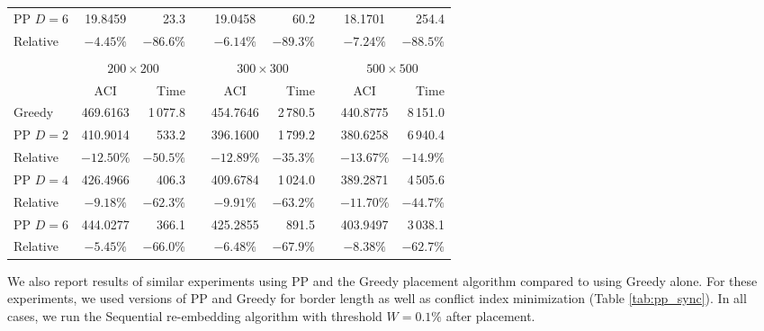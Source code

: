 \begin{table}[t!]
{\begin{tabular}{lcrlcrlcr}
\hline
PP $D=6$ &  19.8459 &  23.3   & &  19.0458 &  60.2   & &  18.1701 &    254.4   \\
Relative & $-4.45\%$&$-86.6\%$& & $-6.14\%$&$-89.3\%$& & $-7.24\%$&   $-88.5\%$\\
\hline
\\
\vspace{1pt}
 & \multicolumn{2}{c}{$200\times 200$} & & \multicolumn{2}{c}{$300\times 300$} & & \multicolumn{2}{c}{$500\times 500$} \\
\cline{2-3} \cline{5-6} \cline{8-9}
\vspace{1pt}
         & ACI      & Time       & & ACI      & Time       & & ACI      & Time       \\
\hline
Greedy   & 469.6163 & 1\,077.8   & & 454.7646 & 2\,780.5   & & 440.8775 & 8\,151.0   \\
\hline
PP $D=2$ & 410.9014 &    533.2   & & 396.1600 & 1\,799.2   & & 380.6258 & 6\,940.4   \\
Relative &$-12.50\%$&   $-50.5\%$& &$-12.89\%$&   $-35.3\%$& &$-13.67\%$&   $-14.9\%$\\
\hline
PP $D=4$ & 426.4966 &    406.3   & & 409.6784 & 1\,024.0   & & 389.2871 & 4\,505.6   \\
Relative & $-9.18\%$&   $-62.3\%$& & $-9.91\%$&   $-63.2\%$& &$-11.70\%$&   $-44.7\%$\\
\hline
PP $D=6$ & 444.0277 &    366.1   & & 425.2855 &    891.5   & & 403.9497 & 3\,038.1   \\
Relative & $-5.45\%$&   $-66.0\%$& & $-6.48\%$&   $-67.9\%$& & $-8.38\%$&   $-62.7\%$\\
\hline
\end{tabular}}
\end{table}

We also report results of similar experiments using PP and the Greedy placement
algorithm compared to using Greedy alone. For these experiments, we used
versions of PP and Greedy for border length as well as conflict index
minimization (Table \ref{tab:pp_sync}). In all cases, we run the Sequential
re-embedding algorithm with threshold $W=0.1\%$ after placement.

